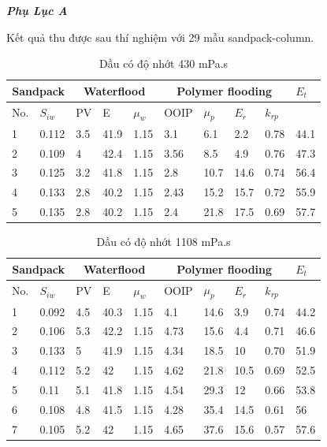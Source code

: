 \documentclass[12pt,a4paper]{article}
\begin{document}
	\clearpage
	\noindent
\textit{\textbf{\LARGE Phụ Lục A}}\\
Kết quả thu được sau thí nghiệm với 29 mẫu sandpack-column.
\begin{table}[h]
\centering
\caption{Dầu có độ nhớt 430 mPa.s}
\label{my-label}
\begin{tabularx}{\textwidth}{@{}XX|XXX|XXXX|X@{}}
\toprule
\multicolumn{2}{c}{Sandpack} & \multicolumn{3}{c}{Waterflood} & \multicolumn{4}{c}{Polymer flooding} & $E_t$ \\ \midrule
No.        & $S_{iw}$        & PV      & E    & $\mu_w$   & OOIP   & $\mu_p$  & $E_r$ & $k_{rp}$ &       \\
1          & 0.112           & 3.5     & 41.9     & 1.15      & 3.1    & 6.1      & 2.2   & 0.78     & 44.1  \\
2          & 0.109           & 4       & 42.4     & 1.15      & 3.56   & 8.5      & 4.9   & 0.76     & 47.3  \\
3          & 0.125           & 3.2     & 41.8     & 1.15      & 2.8    & 10.7     & 14.6  & 0.74     & 56.4  \\
4          & 0.133           & 2.8     & 40.2     & 1.15      & 2.43   & 15.2     & 15.7  & 0.72     & 55.9  \\
5          & 0.135           & 2.8     & 40.2     & 1.15      & 2.4    & 21.8     & 17.5  & 0.69     & 57.7  \\ \bottomrule
\end{tabularx}
\end{table}
\begin{table}[h]
\centering
\caption{Dầu có độ nhớt 1108 mPa.s}
\label{my-label}
\begin{tabularx}{\textwidth}{@{}XX|XXX|XXXX|X@{}}
\toprule
\multicolumn{2}{c}{Sandpack} & \multicolumn{3}{c}{Waterflood} & \multicolumn{4}{c}{Polymer flooding} & $E_t$ \\ \midrule
No.        & $S_{iw}$        & PV      & E    & $\mu_w$   & OOIP   & $\mu_p$  & $E_r$ & $k_{rp}$ &       \\
1          & 0.092            & 4.5     & 40.3     & 1.15      & 4.1    & 14.6     & 3.9   & 0.74     & 44.2  \\
2          & 0.106           & 5.3     & 42.2     & 1.15      & 4.73   & 15.6     & 4.4   & 0.71     & 46.6  \\
3          & 0.133           & 5       & 41.9     & 1.15      & 4.34   & 18.5     & 10    & 0.70     & 51.9  \\
4          & 0.112           & 5.2     & 42       & 1.15      & 4.62   & 21.8     & 10.5  & 0.69     & 52.5  \\
5          & 0.11            & 5.1     & 41.8     & 1.15      & 4.54   & 29.3     & 12    & 0.66     & 53.8  \\
6          & 0.108           & 4.8     & 41.5     & 1.15      & 4.28   & 35.4     & 14.5  & 0.61     & 56    \\
7          & 0.105           & 5.2     & 42       & 1.15      & 4.65   & 37.6     & 15.6  & 0.57     & 57.6  \\ \bottomrule
\end{tabularx}
\end{table}
\end{document}
